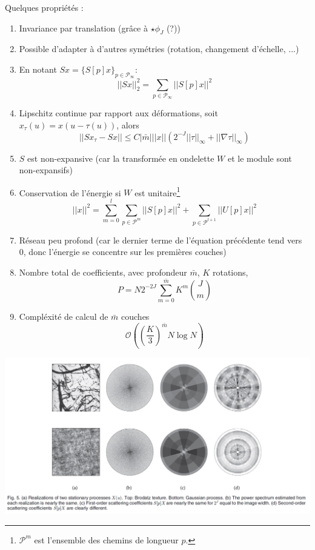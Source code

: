 \documentclass[11pt]{article} %
\begin{document}
\par
Quelques propriétés :
\begin{enumerate}
	\item Invariance par translation (grâce à $\star\phi_J$ (?))
	\item Possible d'adapter à d'autres symétries (rotation, changement d'échelle, ...)
	\item En notant $Sx =\{S[p]x\}_{p\in\mathcal{P}_\infty}$:
		\begin{equation}
			||Sx||_2^2 = \sum_{p\in\mathcal{P}_\infty}||S[p]x||^2
		\end{equation}
	\item Lipschitz continue par rapport aux déformations, soit $x_\tau(u) = x(u-\tau(u))$, alors
	\begin{equation}
		||Sx_\tau - Sx||\leq C|\bar m|||x||(2^{-J}||\tau||_\infty + ||\nabla \tau||_\infty)
	\end{equation}
	\item $S$ est non-expansive (car la transformée en ondelette $W$ et le module sont non-expansifs)
	\item Conservation de l'énergie si $W$ est unitaire\footnote{$\mathcal{P}^m$ est l'ensemble des chemins de longueur $p$.}
	\begin{equation}
		||x||^2 = \sum_{m=0}^{l}\sum_{p\in\mathcal{P}^m}||S[p]x||^2 + \sum_{p\in\mathcal{P}^{l+1}}||U[p]x||^2
	\end{equation}
	\item Réseau peu profond (car le dernier terme de l'équation précédente tend vers 0, donc l'énergie se concentre sur les premières couches)
	\item Nombre total de coefficients, avec profondeur $\bar m$, $K$ rotations,
		\begin{equation}
			P = N2^{-2J}\sum_{m=0}^{\bar m} K^m\binom{J}{m}
		\end{equation} 
	\item Compléxité de calcul de $\bar m$ couches
	\begin{equation}
		\mathcal{O}\left(\left(\frac{K}{3}\right)^{\bar m} N\log{N}\right)
	\end{equation}	
\end{enumerate}
\includegraphics[width=1.2\textwidth]{scat_station}
\end{document}
